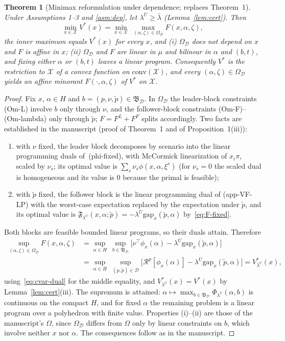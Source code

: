 \documentclass[11pt]{article}
\newtheorem{theorem}{Theorem}
\theoremstyle{definition}
\theoremstyle{remark}
\newcommand{\X}{\mathcal{X}}
\newcommand{\D}{\mathcal{D}}
\newcommand{\tp}{\tilde{p}}
\newcommand{\B}{\mathfrak{B}}
\newcommand{\R}{\mathcal{R}}
\newcommand{\gap}{\mathrm{gap}}
\begin{document}
\begin{theorem}[Minimax reformulation under dependence; replaces Theorem~1]\label{thm:minimax}
Under Assumptions 1--3 and \ref{asm:dep}, let $\lambda^U\ge\bar\lambda$ (Lemma~\ref{lem:cert}). Then
\[
  \min_{x\in\X}V^*(x)=\min_{x\in\X}\ \max_{(\alpha,\zeta)\in\Omega_\D}F(x,\alpha,\zeta),
\]
the inner maximum equals $V^*(x)$ for every $x$, and (i) $\Omega_\D$ does not depend on $x$ and $F$ is affine in $x$; (ii) $\Omega_\D$ and $F$ are linear in $\mu$ and bilinear in $\alpha$ and $(b,t)$, and fixing either $\alpha$ or $(b,t)$ leaves a linear program. Consequently $V^*$ is the restriction to $\X$ of a convex function on $\mathrm{conv}(\X)$, and every $(\alpha,\zeta)\in\Omega_\D$ yields an affine minorant $F(\cdot,\alpha,\zeta)$ of $V^*$ on $\X$.
\end{theorem}

\begin{proof}
Fix $x$, $\alpha\in H$ and $b=(p,\nu,\tp)\in\B_\D$. In $\Omega_\D$ the leader-block constraints (Om-L) involve $b$ only through $\nu$, and the follower-block constraints (Om-F)--(Om-lambda) only through $\tp$; $F=F^L+F^F$ splits accordingly. Two facts are established in the manuscript (proof of Theorem~1 and of Proposition~1(iii)):
\begin{enumerate}[label=(\alph*),nosep]
\item with $\nu$ fixed, the leader block decomposes by scenario into the linear programming duals of~(phi-fixed), with McCormick linearization of $x_i\pi$, scaled by $\nu_s$; its optimal value is $\sum_s\nu_s\phi(x,\alpha,\xi^s)$ (for $\nu_s=0$ the scaled dual is homogeneous and its value is $0$ because the primal is feasible);
\item with $\tp$ fixed, the follower block is the linear programming dual of (app-VF-LP) with the worst-case expectation replaced by the expectation under $\tp$, and its optimal value is $\mathfrak F_{\lambda^U}(x,\alpha;\tp)=-\lambda^U\gap_x(\tp,\alpha)$ by~\eqref{eq:F-fixed}.
\end{enumerate}
Both blocks are feasible bounded linear programs, so their duals attain. Therefore
\[
\begin{aligned}
  \sup_{(\alpha,\zeta)\in\Omega_\D}F(x,\alpha,\zeta)
  &=\sup_{\alpha\in H}\ \sup_{b\in\B_\D}\Big[\nu^\top\phi_x(\alpha)-\lambda^U\gap_x(\tp,\alpha)\Big]\\
  &=\sup_{\alpha\in H}\ \sup_{(p,\tp)\in\D}\Big[\R^p[\phi_x(\alpha)]-\lambda^U\gap_x(\tp,\alpha)\Big]=V^*_{\lambda^U}(x),
\end{aligned}
\]
using~\eqref{eq:cvar-dual} for the middle equality, and $V^*_{\lambda^U}(x)=V^*(x)$ by Lemma~\ref{lem:cert}(iii). The supremum is attained: $\alpha\mapsto\max_{b\in\B_\D}\Phi_{\lambda^U}(\alpha,b)$ is continuous on the compact $H$, and for fixed $\alpha$ the remaining problem is a linear program over a polyhedron with finite value. Properties (i)--(ii) are those of the manuscript's $\Omega$, since $\Omega_\D$ differs from $\Omega$ only by linear constraints on $b$, which involve neither $x$ nor $\alpha$. The consequences follow as in the manuscript.
\end{proof}
\end{document}
